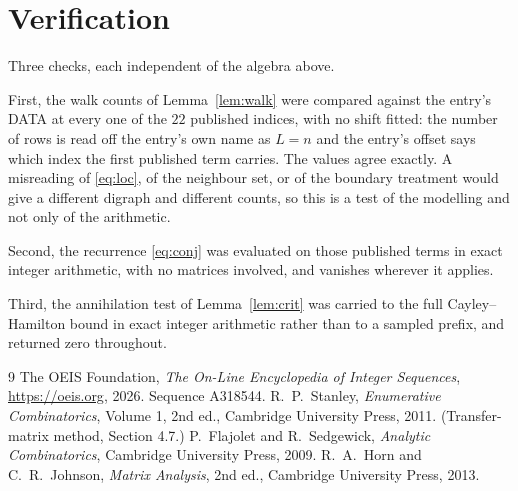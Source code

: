 \documentclass[11pt,a4paper]{article}
\theoremstyle{plain}
\theoremstyle{definition}
\begin{document}
\section{Verification}

Three checks, each independent of the algebra above.

First, the walk counts of Lemma~\ref{lem:walk} were compared against the entry's DATA at
every one of the $22$ published indices, with no shift fitted: the number of rows is
read off the entry's own name as $L=n$ and the entry's offset says which index the first
published term carries. The values agree exactly. A misreading of \eqref{eq:loc}, of the
neighbour set, or of the boundary treatment would give a different digraph and different
counts, so this is a test of the modelling and not only of the arithmetic.

Second, the recurrence \eqref{eq:conj} was evaluated on those published terms in exact
integer arithmetic, with no matrices involved, and vanishes wherever it applies.

Third, the annihilation test of Lemma~\ref{lem:crit} was carried to the full
Cayley--Hamilton bound in exact integer arithmetic rather than to a sampled prefix, and
returned zero throughout.

\begin{thebibliography}{9}
 The OEIS Foundation, \emph{The On-Line Encyclopedia of Integer
Sequences}, \url{https://oeis.org}, 2026. Sequence A318544.
 R.~P.~Stanley, \emph{Enumerative Combinatorics}, Volume 1, 2nd ed.,
Cambridge University Press, 2011. (Transfer-matrix method, Section 4.7.)
 P.~Flajolet and R.~Sedgewick, \emph{Analytic Combinatorics}, Cambridge
University Press, 2009.
 R.~A.~Horn and C.~R.~Johnson, \emph{Matrix Analysis}, 2nd ed., Cambridge
University Press, 2013.
\end{thebibliography}
\end{document}
